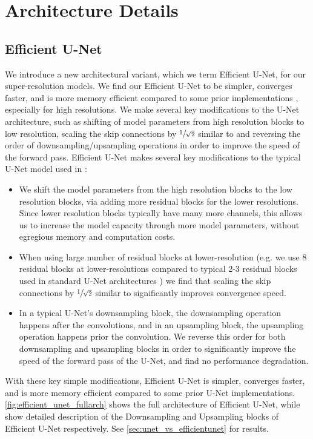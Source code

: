 \section{Architecture Details}
\subsection{Efficient U-Net}
\label{sec:unet_vs_efficient_unet_appendix}
We introduce a new architectural variant, which we term Efficient U-Net, for our super-resolution models. We find our Efficient U-Net to be simpler, converges faster, and is more memory efficient compared to some prior implementations \cite{nichol2021improved}, especially for high resolutions. We make several key modifications to the U-Net architecture, such as shifting of model parameters from high resolution blocks to low resolution, scaling the skip connections by $\sfrac{1}{\sqrt{2}}$ similar to \cite{song2020score, saharia2021image} and reversing the order of downsampling/upsampling operations in order to improve the speed of the forward pass.
Efficient U-Net makes several key modifications to the typical U-Net model used in \cite{dhariwal2021diffusion, sahariac-palette}: 
\begin{itemize}
    \item We shift the model parameters from the high resolution blocks to the low resolution blocks, via adding more residual blocks for the lower resolutions. Since lower resolution blocks typically have many more channels, this allows us to increase the model capacity through more model parameters, without egregious memory and computation costs.
    \item When using large number of residual blocks at lower-resolution (e.g. we use 8 residual blocks at lower-resolutions compared to typical 2-3 residual blocks used in standard U-Net architectures \cite{dhariwal2021diffusion, saharia2021image}) we find that scaling the skip connections by $\sfrac{1}{\sqrt{2}}$ similar to \cite{song2020score, saharia2021image} significantly improves convergence speed.
    \item In a typical U-Net's downsampling block, the downsampling operation happens after the convolutions, and in an upsampling block, the upsampling operation happens prior the convolution. We reverse this order for both downsampling and upsampling blocks in order to significantly improve the speed of the forward pass of the U-Net, and find no performance degradation. 
\end{itemize}  
With these key simple modifications, Efficient U-Net is simpler, converges faster, and is more memory efficient compared to some prior U-Net implementations. \cref{fig:efficient_unet_fullarch} shows the full architecture of Efficient U-Net, while   show detailed description of the Downsampling and Upsampling blocks of Efficient U-Net respectively. See  \cref{sec:unet_vs_efficientunet} for results. 

